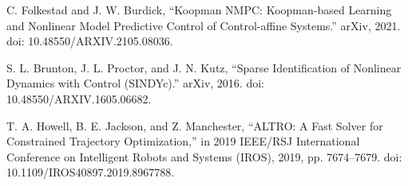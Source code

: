 \documentclass{article}
\begin{document}
\begin{thebibliography}{99}
 C. Folkestad and J. W. Burdick, “Koopman NMPC: Koopman-based Learning and Nonlinear Model Predictive Control of Control-affine Systems.” arXiv, 2021. doi: 10.48550/ARXIV.2105.08036.

 S. L. Brunton, J. L. Proctor, and J. N. Kutz, “Sparse Identification of Nonlinear Dynamics with Control (SINDYc).” arXiv, 2016. doi: 10.48550/ARXIV.1605.06682.

 T. A. Howell, B. E. Jackson, and Z. Manchester, “ALTRO: A Fast Solver for Constrained Trajectory Optimization,” in 2019 IEEE/RSJ International Conference on Intelligent Robots and Systems (IROS), 2019, pp. 7674–7679. doi: 10.1109/IROS40897.2019.8967788.


\end{thebibliography}
\end{document}
